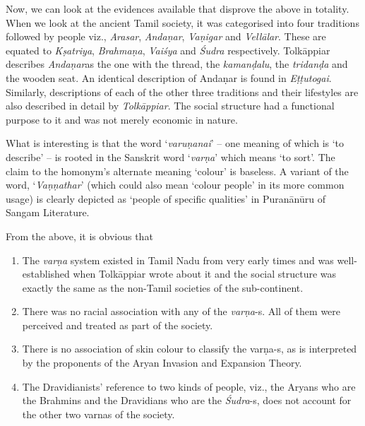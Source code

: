Now, we can look at the evidences available that disprove the above in totality. When we look at the ancient Tamil society, it was categorised into four traditions followed by people viz., \textit{Arasar}, \textit{Andaṇar}, \textit{Vaṇigar} and \textit{Vellālar}. These are equated to \textit{Kṣatriya}, \textit{Brahmaṇa}, \textit{Vaiśya} and \textit{Śudra} respectively. Tolkāppiar describes \textit{Andaṇar}as the one with the thread, the \textit{kamanḍalu}, the \textit{tridanḍa} and the wooden seat. An identical description of Andaṇar is found in \textit{Eṭṭutogai}. Similarly, descriptions of each of the other three traditions and their lifestyles are also described in detail by \textit{Tolkāppiar}. The social structure had a functional purpose to it and was not merely economic in nature.

What is interesting is that the word ‘\textit{varuṇanai}’ – one meaning of which is ‘to describe’ – is rooted in the Sanskrit word ‘\textit{varṇa}’ which means ‘to sort’. The claim to the homonym’s alternate meaning ‘colour’ is baseless. A variant of the word, ‘\textit{Vaṇṇathar}’ (which could also mean ‘colour people’ in its more common usage) is clearly depicted as ‘people of specific qualities’ in Puranānūru of Sangam Literature.

From the above, it is obvious that

\begin{enumerate}[{\rm i)}]
\itemsep=0pt
\item The \textit{varṇa} system existed in Tamil Nadu from very early times and was well-established when Tolkāppiar wrote about it and the social structure was exactly the same as the non-Tamil societies of the sub-continent.

 \item There was no racial association with any of the \textit{varṇa}-s. All of them were perceived and treated as part of the society.

 \item There is no association of skin colour to classify the varṇa-s, as is interpreted by the proponents of the Aryan Invasion and Expansion Theory.

 \item The Dravidianists’ reference to two kinds of people, viz., the Aryans who are the Brahmins and the Dravidians who are the \textit{Śudra}-s, does not account for the other two varnas of the society.

\end{enumerate}


